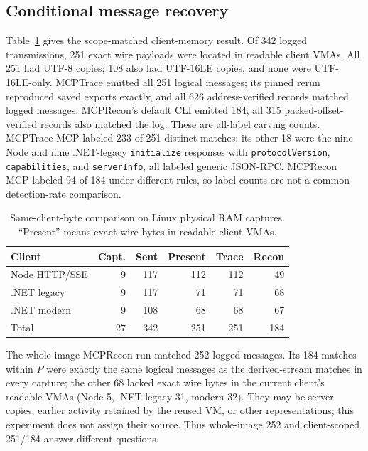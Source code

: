 \documentclass[conference,10pt]{IEEEtran}
\begin{document}
\subsection{Conditional message recovery}
Table~\ref{tab:positive} gives the scope-matched client-memory result. Of 342 logged transmissions, 251 exact wire payloads were located in readable client VMAs. All 251 had UTF-8 copies; 108 also had UTF-16LE copies, and none were UTF-16LE-only. MCPTrace emitted all 251 logical messages; its pinned rerun reproduced saved exports exactly, and all 626 address-verified records matched logged messages. MCPRecon's default CLI emitted 184; all 315 packed-offset-verified records also matched the log. These are all-label carving counts. MCPTrace MCP-labeled 233 of 251 distinct matches; its other 18 were the nine Node and nine .NET-legacy \texttt{initialize} responses with \texttt{protocolVersion}, \texttt{capabilities}, and \texttt{serverInfo}, all labeled generic JSON-RPC. MCPRecon MCP-labeled 94 of 184 under different rules, so label counts are not a common detection-rate comparison.

\begin{table}[t]
\caption{Same-client-byte comparison on Linux physical RAM captures. ``Present'' means exact wire bytes in readable client VMAs.}
\label{tab:positive}
\centering
\footnotesize
\setlength{\tabcolsep}{3pt}
\begin{tabular}{lrrrrr}
\toprule
Client & Capt. & Sent & Present & Trace & Recon \\
\midrule
Node HTTP/SSE & 9 & 117 & 112 & 112 & 49 \\
.NET legacy & 9 & 117 & 71 & 71 & 68 \\
.NET modern & 9 & 108 & 68 & 68 & 67 \\
\midrule
Total & 27 & 342 & 251 & 251 & 184 \\
\bottomrule
\end{tabular}
\end{table}

The whole-image MCPRecon run matched 252 logged messages. Its 184 matches within $P$ were exactly the same logical messages as the derived-stream matches in every capture; the other 68 lacked exact wire bytes in the current client's readable VMAs (Node 5, .NET legacy 31, modern 32). They may be server copies, earlier activity retained by the reused VM, or other representations; this experiment does not assign their source. Thus whole-image 252 and client-scoped 251/184 answer different questions.
\end{document}
